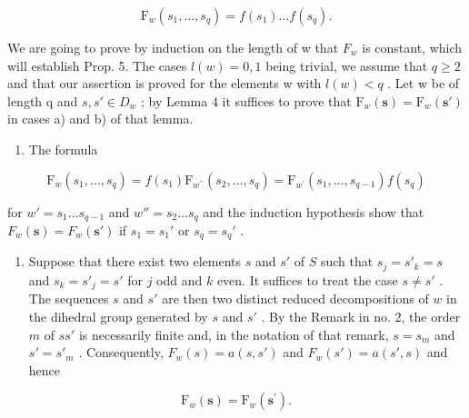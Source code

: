 \[
\mathrm{F} _ {w} (s _ {1}, \dots , s _ {q}) = f (s _ {1}) \dots f (s _ {q}).
\]

We are going to prove by induction on the length of w that \(F_{w}\) is constant, which will establish Prop. 5. The cases \(l(w) = 0, 1\) being trivial, we assume that \(q \geqslant 2\) and that our assertion is proved for the elements w with \(l(w) < q\) . Let w be of length q and \(s, s' \in D_w\) ; by Lemma 4 it suffices to prove that \(\mathrm{F}_{w}(\mathbf{s}) = \mathrm{F}_{w}(\mathbf{s}')\) in cases a) and b) of that lemma.

\begin{enumerate}
\def\labelenumi{\alph{enumi})}
\tightlist
\item
  The formula
\end{enumerate}

\[
\mathrm{F} _ {w} \left(s _ {1}, \dots , s _ {q}\right) = f \left(s _ {1}\right) \mathrm{F} _ {w ^ {\prime \prime}} \left(s _ {2}, \dots , s _ {q}\right) = \mathrm{F} _ {w ^ {\prime}} \left(s _ {1}, \dots , s _ {q - 1}\right) f \left(s _ {q}\right)
\]

for \(w' = s_1 \ldots s_{q-1}\) and \(w'' = s_2 \ldots s_q\) and the induction hypothesis show that \(F_w(\mathbf{s}) = F_w(\mathbf{s}')\) if \(s_1 = s_1'\) or \(s_q = s_q'\) .

\begin{enumerate}
\def\labelenumi{\alph{enumi})}
\setcounter{enumi}{1}
\tightlist
\item
  Suppose that there exist two elements \(s\) and \(s'\) of \(S\) such that \(s_j = s'_k = s\) and \(s_k = s'_j = s'\) for \(j\) odd and \(k\) even. It suffices to treat the case \(s \neq s'\) . The sequences \(s\) and \(s'\) are then two distinct reduced decompositions of \(w\) in the dihedral group generated by \(s\) and \(s'\) . By the Remark in no. 2, the order \(m\) of \(ss'\) is necessarily finite and, in the notation of that remark, \(s = s_m\) and \(s' = s'_m\) . Consequently, \(F_w(s) = a(s, s')\) and \(F_w(s') = a(s', s)\) and hence
\end{enumerate}

\[
\mathrm{F} _ {w} (\mathbf {s}) = \mathrm{F} _ {w} (\mathbf {s} ^ {\prime}).
\]

